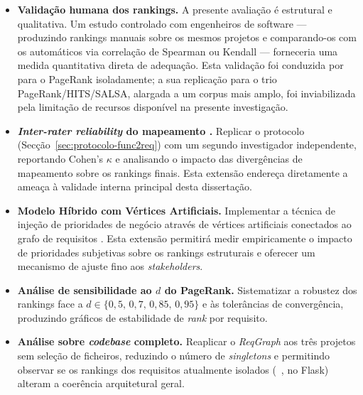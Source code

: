 \begin{itemize}
    \item \textbf{Validação humana dos rankings.} A presente
        avaliação é estrutural e qualitativa. Um estudo controlado
        com engenheiros de software --- produzindo rankings manuais
        sobre os mesmos projetos e comparando-os com os automáticos
        via correlação de Spearman ou Kendall --- forneceria uma
        medida quantitativa direta de adequação. Esta validação foi
        conduzida por \citet{silva2018} para o PageRank
        isoladamente; a sua replicação para o trio PageRank/HITS/SALSA,
        alargada a um corpus mais amplo, foi inviabilizada pela
        limitação de recursos disponível na presente investigação.

    \item \textbf{\emph{Inter-rater reliability} do mapeamento
        .} Replicar o protocolo
        (Secção~\ref{sec:protocolo-func2req}) com um segundo
        investigador independente, reportando Cohen's $\kappa$ e
        analisando o impacto das divergências de mapeamento sobre
        os rankings finais. Esta extensão endereça diretamente a
        ameaça à validade interna principal desta dissertação.

    \item \textbf{Modelo Híbrido com Vértices Artificiais.}
        Implementar a técnica de injeção de prioridades de negócio
        através de vértices artificiais conectados ao grafo de
        requisitos \parencite{silva2018}. Esta extensão permitirá
        medir empiricamente o impacto de prioridades subjetivas
        sobre os rankings estruturais e oferecer um mecanismo de
        ajuste fino aos \emph{stakeholders}.

    \item \textbf{Análise de sensibilidade ao $d$ do PageRank.}
        Sistematizar a robustez dos rankings face a
        $d \in \{0{,}5,\, 0{,}7,\, 0{,}85,\, 0{,}95\}$ e às
        tolerâncias de convergência, produzindo gráficos de
        estabilidade de \emph{rank} por requisito.

    \item \textbf{Análise sobre \emph{codebase} completo.} Reaplicar
        o \emph{ReqGraph} aos três projetos sem seleção de
        ficheiros, reduzindo o número de \emph{singletons} e
        permitindo observar se os rankings dos requisitos
        atualmente isolados (\eg\ ,
         no Flask) alteram a coerência
        arquitetural geral.


\end{itemize}
